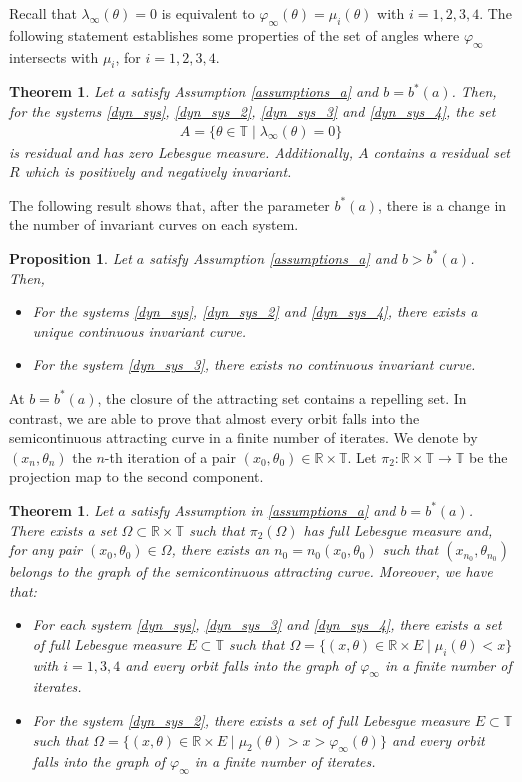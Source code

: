\documentclass[12pt]{article}
\newcommand{\T}{\mathbb{T}}
\newcommand{\R}{\mathbb{R}}
\theoremstyle{plain}
\newtheorem{prop}[defn]{Proposition}
\newtheorem{thm}[defn]{Theorem}
\theoremstyle{remark}
\theoremstyle{definition}
\begin{document}
Recall that $\lambda_\infty(\theta)=0$ is equivalent to $\varphi_\infty(\theta)=\mu_i(\theta)$ with $i=1,2,3,4$. The following statement establishes some properties of the set of angles where $\varphi_\infty$ intersects with $\mu_i$, for $i=1,2,3,4$.
\begin{thm}\label{big_thm}
    Let $a$ satisfy Assumption \eqref{assumptions_a} and $b=b^*(a)$. Then, for the systems \eqref{dyn_sys}, \eqref{dyn_sys_2}, \eqref{dyn_sys_3} and \eqref{dyn_sys_4}, the set
    \begin{align*}
        A = \{\theta\in\T\mid\lambda_\infty(\theta)=0\} 
    \end{align*}
    is residual and has zero Lebesgue measure. Additionally, $A$ contains a residual set $R$ which is positively and negatively invariant.
\end{thm}
The following result shows that, after the parameter $b^*(a)$, there is a change in the number of invariant curves on each system.
\begin{prop}\label{curve_between}
    Let $a$ satisfy Assumption \eqref{assumptions_a} and $b>b^*(a)$. Then, 
    \begin{itemize}
        \item For the systems \eqref{dyn_sys}, \eqref{dyn_sys_2} and \eqref{dyn_sys_4}, there exists a unique continuous invariant curve.
        \item For the system \eqref{dyn_sys_3}, there exists no continuous invariant curve.
    \end{itemize}
\end{prop}

At $b=b^*(a)$, the closure of the attracting set contains a repelling set. In contrast, we are able to prove that almost every orbit falls into the semicontinuous attracting curve in a finite number of iterates. We denote by $(x_n,\theta_n)$ the $n$-th iteration of a pair $(x_0,\theta_0)\in\R\times\T$. Let $\pi_2\colon\R\times\T\to\T$ be the projection map to the second component.
\begin{thm}\label{finite_num_iter}
    Let $a$ satisfy Assumption in \eqref{assumptions_a} and $b=b^*(a)$. There exists a set $\Omega\subset\R\times\T$ such that $\pi_2(\Omega)$ has full Lebesgue measure and, for any pair $(x_0,\theta_0)\in \Omega$, there exists an $n_0 = n_0(x_0,\theta_0)$ such that $(x_{n_0},\theta_{n_0})$ belongs to the graph of the semicontinuous attracting curve. Moreover, we have that:
    \begin{itemize}
        \item For each system \eqref{dyn_sys}, \eqref{dyn_sys_3} and \eqref{dyn_sys_4}, there exists a set of full Lebesgue measure $E\subset\T$ such that $\Omega=\{(x,\theta)\in\R\times E\mid\mu_i(\theta)<x\}$ with $i=1,3,4$ and every orbit falls into the graph of $\varphi_\infty$ in a finite number of iterates.
        \item For the system \eqref{dyn_sys_2}, there exists a set of full Lebesgue measure $E\subset\T$ such that $\Omega=\{(x,\theta)\in\R\times E\mid\mu_2(\theta)>x>\varphi_\infty(\theta)\}$ and every orbit falls into the graph of $\varphi_\infty$ in a finite number of iterates.
    \end{itemize}
\end{thm}
\end{document}
